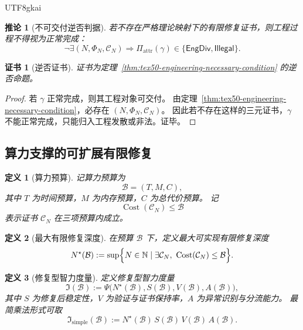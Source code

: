 \documentclass[12pt]{article}
\newtheorem{definition}{定义}[section]
\newtheorem{corollary}{推论}[section]
\newtheorem{Certificate}{证书}[section]
\newcommand{\NN}{\mathbb{N}}
\newcommand{\Cost}{\operatorname{Cost}}
\newcommand{\EngDiv}{\mathsf{EngDiv}}
\begin{document}
\begin{CJK*}{UTF8}{gkai}
\begin{corollary}[不可交付逆否判据]
\label{cor:tex50-nondeployable-contrapositive}
若不存在严格理论映射下的有限修复证书，则工程过程不得视为正常完成：
\[
  \neg\exists(N,\Phi_N,\mathcal C_N)
  \Rightarrow
  \Pi_{\mathrm{attr}}(\gamma)\in\{\EngDiv,\mathsf{Illegal}\}.
\]
\end{corollary}

\begin{Certificate}[逆否证书]
证书为定理~\ref{thm:tex50-engineering-necessary-condition} 的逆否命题。
\end{Certificate}

\begin{proof}
若 $\gamma$ 正常完成，则其工程对象可交付。
由定理~\ref{thm:tex50-engineering-necessary-condition}，必存在 $(N,\Phi_N,\mathcal C_N)$。
因此若不存在这样的三元证书，$\gamma$ 不能正常完成，只能归入工程发散或非法。证毕。
\end{proof}

\subsection{算力支撑的可扩展有限修复}
\label{subsec:tex50-scalable-finite-repair}

\begin{definition}[算力预算]
\label{def:tex50-compute-budget}
记算力预算为
\[
  \mathcal B=(T,M,C),
\]
其中 $T$ 为时间预算，$M$ 为内存预算，$C$ 为总代价预算。
记
\[
  \Cost(\mathcal C_N)\le\mathcal B
\]
表示证书 $\mathcal C_N$ 在三项预算内成立。
\end{definition}

\begin{definition}[最大有限修复深度]
\label{def:tex50-max-finite-repair-depth}
在预算 $\mathcal B$ 下，定义最大可实现有限修复深度
\[
  N^\star(\mathcal B)
  :=
  \sup\Bigl\{
    N\in\NN
    \mid
    \exists\mathcal C_N,\
    \Cost(\mathcal C_N)\le\mathcal B
  \Bigr\}.
\]
\end{definition}

\begin{definition}[修复型智力度量]
\label{def:tex50-intelligence-measure}
定义修复型智力度量
\[
  \mathfrak I(\mathcal B)
  :=
  \Psi\bigl(
    N^\star(\mathcal B),
    S(\mathcal B),
    V(\mathcal B),
    A(\mathcal B)
  \bigr),
\]
其中 $S$ 为修复后稳定性，$V$ 为验证与证书保持率，$A$ 为异常识别与分流能力。
最简乘法形式可取
\[
  \mathfrak I_{\mathrm{simple}}(\mathcal B)
  :=
  N^\star(\mathcal B)\,S(\mathcal B)\,V(\mathcal B)\,A(\mathcal B).
\]
\end{definition}


\end{CJK*}
\end{document}
